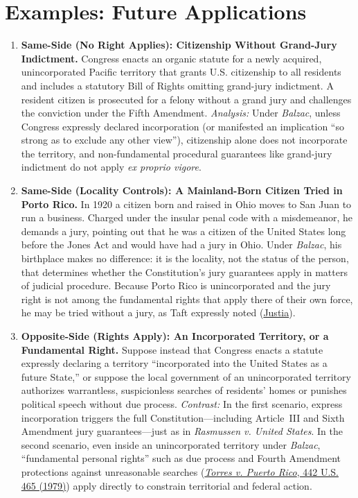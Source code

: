\documentclass[12pt]{article}
\begin{document}
\section{Examples: Future Applications}
\begin{enumerate}

\item \textbf{Same-Side (No Right Applies): Citizenship Without Grand-Jury Indictment.} Congress enacts an organic statute for a newly acquired, unincorporated Pacific territory that grants U.S. citizenship to all residents and includes a statutory Bill of Rights omitting grand-jury indictment. A resident citizen is prosecuted for a felony without a grand jury and challenges the conviction under the Fifth Amendment. \textit{Analysis:} Under \textit{Balzac}, unless Congress expressly declared incorporation (or manifested an implication ``so strong as to exclude any other view''), citizenship alone does not incorporate the territory, and non-fundamental procedural guarantees like grand-jury indictment do not apply \textit{ex proprio vigore}.

\item \textbf{Same-Side (Locality Controls): A Mainland-Born Citizen Tried in Porto Rico.} In 1920 a citizen born and raised in Ohio moves to San Juan to run a business. Charged under the insular penal code with a misdemeanor, he demands a jury, pointing out that he was a citizen of the United States long before the Jones Act and would have had a jury in Ohio. Under \textit{Balzac}, his birthplace makes no difference: it is the locality, not the status of the person, that determines whether the Constitution's jury guarantees apply in matters of judicial procedure. Because Porto Rico is unincorporated and the jury right is not among the fundamental rights that apply there of their own force, he may be tried without a jury, as Taft expressly noted (\href{https://supreme.justia.com/cases/federal/us/258/298/}{Justia}).

\item \textbf{Opposite-Side (Rights Apply): An Incorporated Territory, or a Fundamental Right.} Suppose instead that Congress enacts a statute expressly declaring a territory ``incorporated into the United States as a future State,'' or suppose the local government of an unincorporated territory authorizes warrantless, suspicionless searches of residents' homes or punishes political speech without due process. \textit{Contrast:} In the first scenario, express incorporation triggers the full Constitution---including Article~III and Sixth Amendment jury guarantees---just as in \textit{Rasmussen v. United States}. In the second scenario, even inside an unincorporated territory under \textit{Balzac}, ``fundamental personal rights'' such as due process and Fourth Amendment protections against unreasonable searches (\href{https://supreme.justia.com/cases/federal/us/442/465/}{\textit{Torres v. Puerto Rico}, 442 U.S. 465 (1979)}) apply directly to constrain territorial and federal action.


\end{enumerate}
\end{document}
